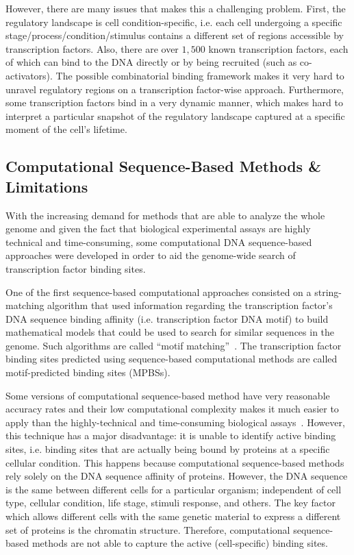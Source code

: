 However, there are many issues that makes this a challenging problem. First, the regulatory landscape is cell condition-specific, i.e. each cell undergoing a specific stage/process/condition/stimulus contains a different set of regions accessible by transcription factors. Also, there are over $1,500$ known transcription factors, each of which can bind to the DNA directly or by being recruited (such as co-activators). The possible combinatorial binding framework makes it very hard to unravel regulatory regions on a transcription factor-wise approach. Furthermore, some transcription factors bind in a very dynamic manner, which makes hard to interpret a particular snapshot of the regulatory landscape captured at a specific moment of the cell's lifetime.

\subsection{Computational Sequence-Based Methods \& Limitations}
\label{sec:computational.sequence.method}

With the increasing demand for methods that are able to analyze the whole genome and given the fact that biological experimental assays are highly technical and time-consuming, some computational DNA sequence-based approaches were developed in order to aid the genome-wide search of transcription factor binding sites.

One of the first sequence-based computational approaches consisted on a string-matching algorithm that used information regarding the transcription factor's DNA sequence binding affinity (i.e. transcription factor DNA motif) to build mathematical models that could be used to search for similar sequences in the genome. Such algorithms are called ``motif matching''~\cite{stormo2000}. The transcription factor binding sites predicted using sequence-based computational methods are called motif-predicted binding sites (MPBSs).

Some versions of computational sequence-based method have very reasonable accuracy rates and their low computational complexity makes it much easier to apply than the highly-technical and time-consuming biological assays~\cite{mathelier2013}. However, this technique has a major disadvantage: it is unable to identify active binding sites, i.e. binding sites that are actually being bound by proteins at a specific cellular condition. This happens because computational sequence-based methods rely solely on the DNA sequence affinity of proteins. However, the DNA sequence is the same between different cells for a particular organism; independent of cell type, cellular condition, life stage, stimuli response, and others. The key factor which allows different cells with the same genetic material to express a different set of proteins is the chromatin structure. Therefore, computational sequence-based methods are not able to capture the active (cell-specific) binding sites.


